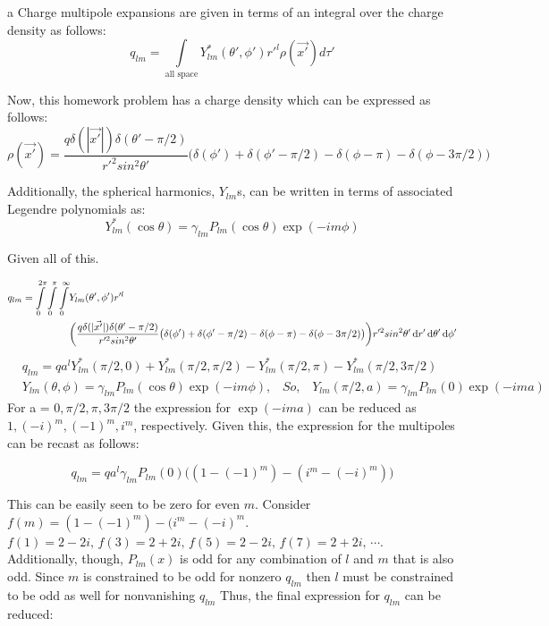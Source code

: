 \begin{homeworkProblem}

\begin{homeworkSection}{a}
Charge multipole expansions are given in terms of an integral over the charge density as follows: \[ q_{lm} = \int\limits_{\text{all space}} Y_{lm}^*(\theta',\phi')r'^l \rho(\vec{x'})d\tau' \]

Now, this homework problem has a charge density which can be expressed as follows: \[ \rho(\vec{x'}) = \frac{q\delta(|\vec{x'}|)\delta(\theta'-\pi/2)}{r'^2sin^2\theta'} \big( \delta(\phi') + \delta(\phi'- \pi/2) - \delta(\phi - \pi) - \delta(\phi - 3\pi/2) \big) \]

Additionally, the spherical harmonics, $Y_{lm}$s, can be written in terms of associated Legendre polynomials as: \[Y_{lm}^*(\cos\theta) = \gamma_{lm}P_{lm}(\cos\theta)\exp(-im\phi) \]

Given all of this.

\begin{align*}
	q_{lm} = \int\limits_0^{2\pi} \int\limits_0^\pi \int\limits_0^\infty& Y_{lm}(\theta',\phi')r'^l \\ &\bigg( \frac{q\delta(|\vec{x'}|)\delta(\theta'-\pi/2)}{r'^2sin^2\theta'} \big( \delta(\phi') + \delta(\phi'- \pi/2) - \delta(\phi - \pi) - \delta(\phi - 3\pi/2) \big) \bigg) r'^2 sin^2\theta' \mathop{}\!\mathrm{d} r' \mathop{}\!\mathrm{d}\theta' \mathop{}\!\mathrm{d}\phi' \\
\end{align*}
\begin{align*}
	 &q_{lm} = q a^l Y_{lm}^*(\pi/2,0)+Y_{lm}^*(\pi/2,\pi/2) -Y_{lm}^*(\pi/2,\pi)-Y_{lm}^*(\pi/2,3\pi/2) \\
   &Y_{lm}(\theta,\phi) = \gamma_{lm} P_{lm}(\cos\theta)\exp(-i m \phi) \textit{,}\quad \textit{So,} \quad Y_{lm}(\pi/2,a) = \gamma_{lm} P_{lm}(0)\exp(-i m a)
\end{align*}
For a = $0,\pi/2,\pi,3\pi/2$ the expression for $\exp(-i m a)$ can be reduced as $1,(-i)^m,(-1)^m,i^m$, respectively. Given this, the expression for the multipoles can be recast as follows:

\[
    q_{lm} = q a^l \gamma_{lm} P_{lm}(0)\big( (1-(-1)^m) - (i^m - (-i)^m) \big)
\]

This can be easily seen to be zero for even $m$. Consider $f(m) =  (1-(-1)^m) - (i^m - (-i)^m $. $f(1) = 2-2i,\, f(3) = 2+2i,\, f(5) = 2-2i,\, f(7) = 2+2i,\, \cdots$. Additionally, though, $P_{lm}(x)$ is odd for any combination of $l$ and $m$ that is also odd. Since $m$ is constrained to be odd for nonzero $q_{lm}$ then $l$ must be constrained to be odd as well for nonvanishing $q_{lm}$ Thus, the final expression for $q_{lm}$ can be reduced:


\end{homeworkSection}
\end{homeworkProblem}
